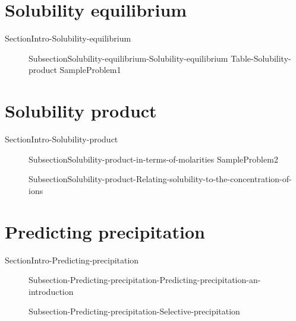 \documentclass[main.tex]{subfiles}
\begin{document}
\section{Solubility equilibrium } {SectionIntro-Solubility-equilibrium}
\sloppy\begin{description}
\item[] {SubsectionSolubility-equilibrium-Solubility-equilibrium}
{Table-Solubility-product}
{SampleProblem1}
\end{description}


\section{Solubility product}   {SectionIntro-Solubility-product}
\sloppy\begin{description}
\item[]  {SubsectionSolubility-product-in-terms-of-molarities}
{SampleProblem2}
\item[]  {SubsectionSolubility-product-Relating-solubility-to-the-concentration-of-ions}
\end{description}



\section{Predicting precipitation } {SectionIntro-Predicting-precipitation}
\sloppy\begin{description}
\item[]{Subsection-Predicting-precipitation-Predicting-precipitation-an-introduction}
\item[] {Subsection-Predicting-precipitation-Selective-precipitation}
\end{description}
\end{document}
